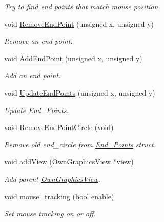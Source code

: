 \begin{DoxyCompactItemize}
\begin{DoxyCompactList}\small\item\em Try to find end points that match mouse position. \end{DoxyCompactList}\item 
void \mbox{\hyperlink{classOwnGraphicsScene_a4f029a37e96fc022295ce4e421319ddf}{Remove\+End\+Point}} (unsigned x, unsigned y)
\begin{DoxyCompactList}\small\item\em Remove an end point. \end{DoxyCompactList}\item 
void \mbox{\hyperlink{classOwnGraphicsScene_a64ce3afc4e535576fedbfe3f172cea0d}{Add\+End\+Point}} (unsigned x, unsigned y)
\begin{DoxyCompactList}\small\item\em Add an end point. \end{DoxyCompactList}\item 
void \mbox{\hyperlink{classOwnGraphicsScene_adf8d1495517483ba65c1ccbc95920a1c}{Update\+End\+Points}} (unsigned x, unsigned y)
\begin{DoxyCompactList}\small\item\em Update \mbox{\hyperlink{structEnd__Points}{End\+\_\+\+Points}}. \end{DoxyCompactList}\item 
void \mbox{\hyperlink{classOwnGraphicsScene_a4b1ba1b97b89baad08c3ba5471ebb61f}{Remove\+End\+Point\+Circle}} (void)
\begin{DoxyCompactList}\small\item\em Remove old end\+\_\+circle from \mbox{\hyperlink{structEnd__Points}{End\+\_\+\+Points}} struct. \end{DoxyCompactList}\item 
void \mbox{\hyperlink{classOwnGraphicsScene_a8677d9cbb1f01943c303be0985c84fbe}{add\+View}} (\mbox{\hyperlink{classOwnGraphicsView}{Own\+Graphics\+View}} $\ast$view)
\begin{DoxyCompactList}\small\item\em Add parent \mbox{\hyperlink{classOwnGraphicsView}{Own\+Graphics\+View}}. \end{DoxyCompactList}\item 
void \mbox{\hyperlink{classOwnGraphicsScene_adbcfda0bade866b7e5db29b7bfb53e0c}{mouse\+\_\+tracking}} (bool enable)
\begin{DoxyCompactList}\small\item\em Set mouse tracking on or off. \end{DoxyCompactList}\end{DoxyCompactItemize}
